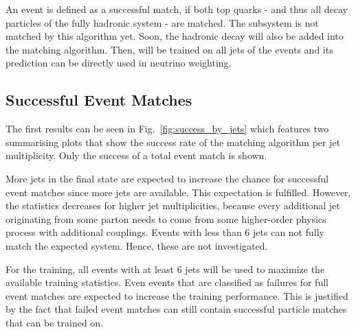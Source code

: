 \documentclass[bachelor,ngerman,english]{GAUBM}
\begin{document}
An event is defined as a successful match, if both top quarks - and thus all decay particles of the fully hadronic \ttbar system - are matched. The \HWW subsystem is not matched by this algorithm yet. Soon, the hadronic \wboson decay will also be added into the matching algorithm. Then, \spanet will be trained on all jets of the events and its prediction can be directly used in neutrino weighting.   

\subsection{Successful Event Matches}
\label{sec:status:successful_event_matches}
The first results can be seen in Fig.~\ref{fig:success_by_jets} which features two summarising plots that show the success rate of the matching algorithm per jet multiplicity. Only the success of a total event match is shown. 

More jets in the final state are expected to increase the chance for successful event matches since more jets are available. This expectation is fulfilled. However, the statistics decreases for higher jet multiplicities, because every additional jet originating from some parton needs to come from some higher-order physics process with additional couplings. Events with less than 6 jets can not fully match the expected \ttbar system. Hence, these are not investigated.

For the training, all events with at least 6 jets will be used to maximize the available training statistics. Even events that are classified as failures for full event matches are expected to increase the training performance. This is justified by the fact that failed event matches can still contain successful particle matches that can be trained on.
\end{document}

